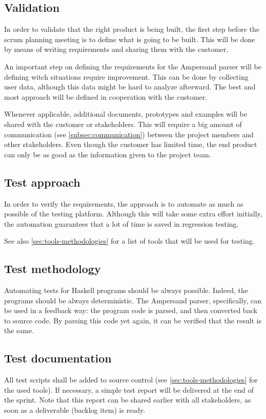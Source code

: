 \subsection{Validation}
In order to validate that the right product is being built, the first step before the scrum planning meeting is to define what is going to be built.
This will be done by means of writing requirements and sharing them with the customer.

An important step on defining the requirements for the Ampersand parser will be defining witch situations require improvement.
This can be done by collecting user data, although this data might be hard to analyze afterward.
The best and most approach will be defined in cooperation with the customer.

Whenever applicable, additional documents, prototypes and examples will be shared with the customer or stakeholders.
This will require a big amount of communication (see \autoref{subsec:communication}) between the project members and other stakeholders.
Even though the customer has limited time, the end product can only be as good as the information given to the project team.

\subsection{Test approach}
In order to verify the requirements, the approach is to automate as much as possible of the testing platform.
Although this will take some extra effort initially, the automation guarantees that a lot of time is saved in regression testing.

See also \autoref{sec:tools-methodologies} for a list of tools that will be used for testing.

\subsection{Test methodology}
Automating tests for Haskell programs should be always possible.
Indeed, the programs should be always deterministic.
The Ampersand parser, specifically, can be used in a feedback way: the program code is parsed, and then converted back to source code.
By parsing this code yet again, it can be verified that the result is the same.

\subsection{Test documentation}
\label{subsec:test-documentation}
All test scripts shall be added to source control (see \autoref{sec:tools-methodologies} for the used tools).
If necessary, a simple test report will be delivered at the end of the sprint.
Note that this report can be shared earlier with all stakeholders, as soon as a deliverable (backlog item) is ready.

